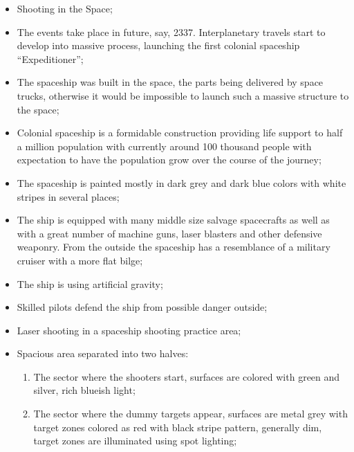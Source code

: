 \documentclass{article}
\begin{document}
\begin{itemize}

  \item Shooting in the Space;

  \item The events take place in future, say, 2337. Interplanetary travels start
    to develop into massive process, launching the first colonial spaceship
    ``Expeditioner'';

  \item The spaceship was built in the space, the parts being delivered by space
    trucks, otherwise it would be impossible to launch such a massive structure
    to the space;

  \item Colonial spaceship is a formidable construction providing life support
    to half a million population with currently around 100 thousand people with
    expectation to have the population grow over the course of the journey;

  \item The spaceship is painted mostly in dark grey and dark blue colors with
    white stripes in several places;

  \item The ship is equipped with many middle size salvage spacecrafts as well
    as with a great number of machine guns, laser blasters and other defensive
    weaponry. From the outside the spaceship has a resemblance of a military
    cruiser with a more flat bilge;

  \item The ship is using artificial gravity;

  \item Skilled pilots defend the ship from possible danger outside;

  \item Laser shooting in a spaceship shooting practice area;

  \item Spacious area separated into two halves:

    \begin{enumerate}

      \item The sector where the shooters start, surfaces are colored with
        green and silver, rich blueish light;

      \item The sector where the dummy targets appear, surfaces are metal grey
        with target zones colored as red with black stripe pattern, generally
        dim, target zones are illuminated using spot lighting;


\end{enumerate}
\end{itemize}
\end{document}
